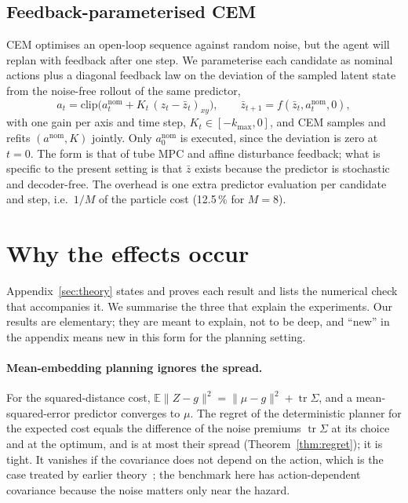 \documentclass[preprint,12pt]{elsarticle}
\begin{document}
\subsection{Feedback-parameterised CEM}\label{sec:fb}
CEM optimises an open-loop sequence against random noise, but the agent will replan with feedback after one step.
We parameterise each candidate as nominal actions plus a diagonal feedback law on the deviation of the sampled latent state from the noise-free rollout of the same predictor,
\begin{equation}\label{eq:fb}
a_t=\mathrm{clip}\big(a^{\mathrm{nom}}_t+K_t\,(z_t-\bar z_t)_{xy}\big),\qquad \bar z_{t+1}=f(\bar z_t,a^{\mathrm{nom}}_t,0),
\end{equation}
with one gain per axis and time step, $K_t\in[-k_{\max},0]$, and CEM samples and refits $(a^{\mathrm{nom}},K)$ jointly.
Only $a^{\mathrm{nom}}_0$ is executed, since the deviation is zero at $t=0$.
The form is that of tube MPC and affine disturbance feedback; what is specific to the present setting is that $\bar z$ exists because the predictor is stochastic and decoder-free.
The overhead is one extra predictor evaluation per candidate and step, i.e.\ $1/M$ of the particle cost (12.5\,\% for $M=8$).

\section{Why the effects occur}\label{sec:theorysummary}

Appendix~\ref{sec:theory} states and proves each result and lists the numerical check that accompanies it.
We summarise the three that explain the experiments.
Our results are elementary; they are meant to explain, not to be deep, and ``new'' in the appendix means new in this form for the planning setting.

\paragraph{Mean-embedding planning ignores the spread.}
For the squared-distance cost, $\mathbb E\|Z-g\|^2=\|\mu-g\|^2+\operatorname{tr}\Sigma$, and a mean-squared-error predictor converges to $\mu$.
The regret of the deterministic planner for the expected cost equals the difference of the noise premiums $\operatorname{tr}\Sigma$ at its choice and at the optimum, and is at most their spread (Theorem~\ref{thm:regret}); it is tight.
It vanishes if the covariance does not depend on the action, which is the case treated by earlier theory~\cite{vjepa2026}; the benchmark here has action-dependent covariance because the noise matters only near the hazard.
\end{document}
